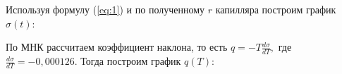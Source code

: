 \documentclass[a4paper,11.5pt]{article} %
\begin{document}
Используя формулу (\ref{eq:1}) и по полученному $r$ капилляра построим график $\sigma(t)$:

\newpage

\begin{figure}[h]
	\label{gr:2}
\end{figure}

По МНК рассчитаем коэффициент наклона, то есть $q = - T\frac{d \sigma}{d T},$ где $\frac{d \sigma}{d T} = -0,000126$. Тогда построим график $q (T)$:

\begin{figure}[h]
	\label{gr:3}
\end{figure}
\end{document}

